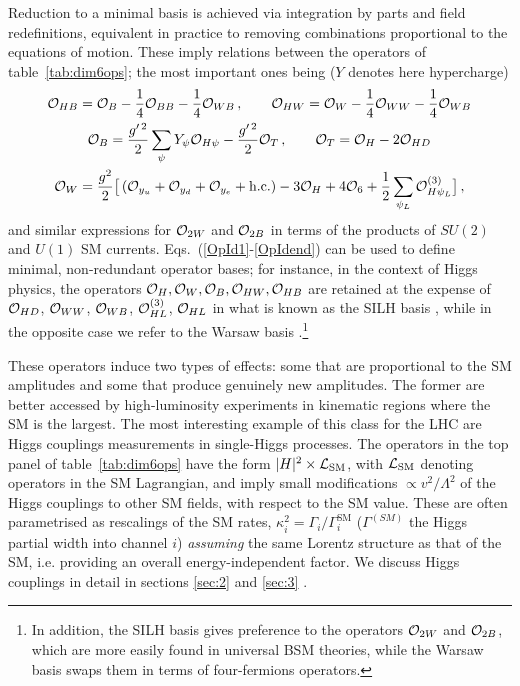 Reduction to a minimal basis is achieved via  integration by parts and  field redefinitions, equivalent in practice to removing combinations proportional to the equations of motion. 
These imply  relations between the operators of table~\ref{tab:dim6ops}; the most important ones being ($Y$ denotes here  hypercharge)
\begin{gather}
{\cal O}_{HB}={\cal O}_{B}-\frac{1}{4}{\cal O}_{BB}-\frac{1}{4}{\cal O}_{WB}\,,\quad \quad {\cal O}_{HW}={\cal O}_W-\frac{1}{4}{\cal O}_{WW}-\frac{1}{4}{\cal O}_{WB}\label{OpId1}\\
{\cal O}_B= \frac{g^{\prime\, 2}}{2}\sum_\psi Y_\psi {\cal O}_{H\psi}  -\frac{g^{\prime\, 2}}{2}{\cal O}_T\,,\quad\quad  {\cal O}_T={\cal O}_H-2{\cal O}_{HD}\\
{\cal O}_W= \frac{g^2}{2}\big[\left({\cal O}_{y_u}+{\cal O}_{y_d}+{\cal O}_{y_e}+\text{h.c.}\right)-3{\cal O}_{H}+4{\cal O}_{6} +  \frac{1}{2}\sum_{\psi_L} {\cal O}_{H\psi_L}^{(3)}\big]\, ,
 \label{OpIdend}
\end{gather}
and similar expressions for ${\cal O}_{2W}$ and ${\cal O}_{2B}$ in terms of the products of $SU(2)$ and $U(1)$ SM currents.
Eqs.~(\ref{OpId1}-\ref{OpIdend}) can be used to define minimal,  non-redundant operator bases; for instance, in the context of Higgs physics, the operators ${\cal O}_H,{\cal O}_W, {\cal O}_B,{\cal O}_{HW},{\cal O}_{HB}$ are retained  at the expense of  ${\cal O}_{HD}$, ${\cal O}_{WW}$, ${\cal O}_{WB}$, ${\cal O}_{HL}^{(3)}$, ${\cal O}_{HL}$ in what is known as the SILH basis \cite{Giudice:2007fh}, while in the opposite case  we refer to the Warsaw basis \cite{Grzadkowski:2010es}.\footnote{In addition, the SILH basis gives preference to the operators ${\cal O}_{2W}$ and  ${\cal O}_{2B}$, which are more easily found in universal BSM theories, while the Warsaw basis swaps them in terms of four-fermions operators.}



These operators induce two types of effects: some that are proportional to the SM amplitudes and some that  produce  genuinely new amplitudes. The former are  better accessed by high-luminosity experiments in kinematic regions where the SM is the largest. The most interesting example of this class for the LHC are  Higgs couplings measurements in single-Higgs processes. 
The operators in the top panel of table~\ref{tab:dim6ops}  have the form 
$|H|^2 \times {\cal L}_{\textrm{SM}}$, with ${\cal L}_{\textrm{SM}}$ denoting operators in the SM Lagrangian, and  imply small modifications $\propto v^2/\Lambda^2$  of the Higgs couplings to other SM fields, with respect to the SM value.
These are often parametrised as rescalings of the SM rates, $\kappa_{i}^2=\Gamma_{i}/\Gamma^{\textrm{SM}}_{i}$ ($\Gamma^{(SM)}$ the  Higgs partial width into channel $i$)  \emph{assuming} the same Lorentz structure as that of the SM, i.e. providing an overall energy-independent factor. We discuss Higgs couplings in detail in sections \ref{sec:2} and \ref{sec:3} .


